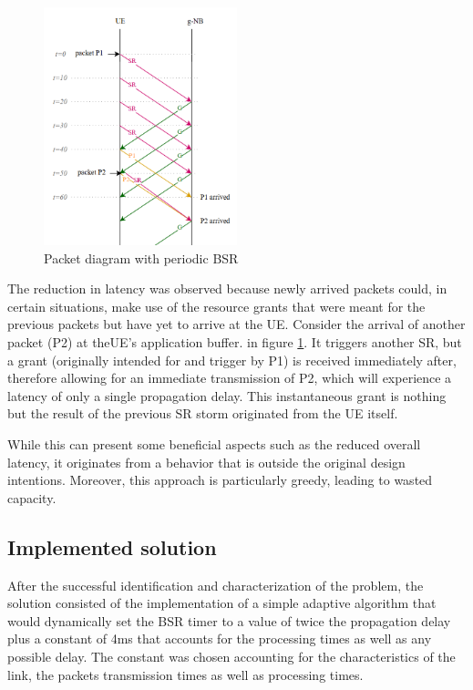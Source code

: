 \begin{figure}[ht]
    \centering
    \includegraphics[width=0.5\textwidth]{res/diagram-wasted-grants.png}
    \caption{Packet diagram with periodic \ac{BSR}}
    \label{fig:diagram-wasted-capacity}
\end{figure}

The reduction in latency was observed because newly arrived packets could, in certain situations, make use of the resource grants that were meant for the previous packets but have yet to arrive at the \ac{UE}. Consider the arrival of another packet (P2) at the\ac{UE}'s application buffer. in figure \ref{fig:diagram-wasted-capacity}. It triggers another \ac{SR}, but a grant (originally intended for and trigger by P1) is received immediately after, therefore allowing for an immediate transmission of P2, which will experience a latency of only a single propagation delay. This instantaneous grant is nothing but the result of the previous \ac{SR} storm originated from the \ac{UE} itself.

While this can present some beneficial aspects such as the reduced overall latency, it originates from a behavior that is outside the original design intentions. Moreover, this approach is particularly greedy, leading to wasted capacity.

\subsection{Implemented solution}

After the successful identification and characterization of the problem, the  solution consisted of the implementation of a simple adaptive algorithm that would dynamically set the \ac{BSR} timer to a value of twice the propagation delay plus a constant of 4ms that accounts for the processing times as well as any possible delay. The constant was chosen accounting for the characteristics of the link, the packets transmission times as well as processing times.

